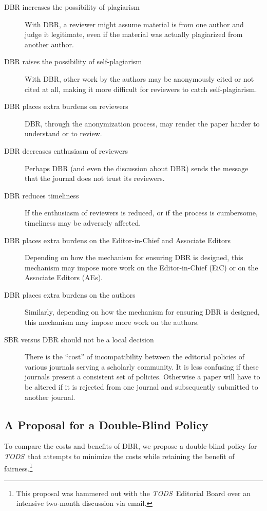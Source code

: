 \documentclass[acmtods,acmnow]{acmtrans2m}
\newcommand{\tods}{{\em TODS\/}}
\begin{document}
\begin{description}
\item[DBR increases the possibility of plagiarism] With DBR, a reviewer
might assume material is from one author and judge it legitimate, even if
the material was actually plagiarized from another author.

\item[DBR raises the possibility of self-plagiarism] With DBR, other work
by the authors may be anonymously cited or not cited at all, making it more
difficult for reviewers to catch self-plagiarism.

\item[DBR places extra burdens on reviewers] DBR, through the
anonymization process, may render the paper harder to understand or to review.

\item[DBR decreases enthusiasm of reviewers] Perhaps DBR (and even the
discussion about DBR) sends the message that the journal does not trust its
reviewers.

\item[DBR reduces timeliness]
If the enthusiasm of reviewers is reduced, or if the process is cumbersome,
timeliness may be adversely affected.

\item[DBR places extra burdens on the Editor-in-Chief and Associate
Editors]
Depending on how the mechanism for ensuring DBR is designed, this mechanism
may impose more work on the Editor-in-Chief (EiC) or on the Associate
Editors (AEs).

\item[DBR places extra burdens on the authors]
Similarly, depending on how the mechanism for ensuring DBR is designed, this
mechanism may impose more work on the authors.

\item[SBR versus DBR should not be a local decision]
There is the ``cost'' of incompatibility between the editorial policies of
various journals serving a scholarly community. It is less confusing if these
journals present a consistent set of policies. Otherwise a paper will have
to be altered if it is rejected from one journal and subsequently submitted
to another journal.
\end{description}

\subsection{A Proposal for a Double-Blind Policy}\label{sec:proposal}
To compare the costs and benefits of DBR, we propose a double-blind policy
for \tods\ that attempts to minimize the costs while retaining the benefit
of fairness.\footnote{This proposal was hammered out with the \tods\
  Editorial Board over an intensive two-month discussion via email.}
\end{document}
